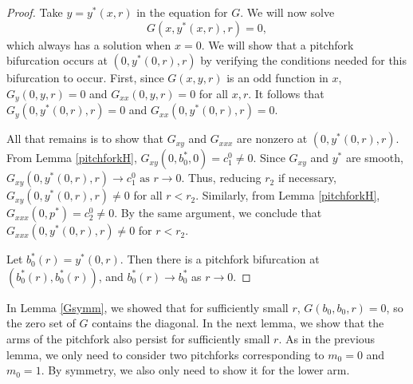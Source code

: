 \documentclass[thesis.tex]{subfiles}
\begin{document}
\begin{lemma}
\begin{proof}
Take $y = y^*(x, r)$ in the equation for $G$. We will now solve
\begin{equation*}
G(x, y^*(x, r), r) = 0,
\end{equation*}
which always has a solution when $x = 0$. We will show that a pitchfork bifurcation occurs at $(0, y^*(0, r), r)$ by verifying the conditions needed for this bifurcation to occur. First, since $G(x, y, r)$ is an odd function in $x$, $G_y(0, y, r) = 0$ and $G_{xx}(0, y, r) = 0$ for all $x, r$. It follows that $G_y(0, y^*(0, r), r) = 0$ and $G_{xx}(0, y^*(0, r), r) = 0$.

All that remains is to show that $G_{xy}$ and $G_{xxx}$ are nonzero at $(0, y^*(0, r), r)$. From Lemma \ref{pitchforkH}, $G_{xy}(0, b_0^*, 0) = c_1^0 \neq 0$. Since $G_{xy}$ and $y^*$ are smooth, $G_{xy}(0, y^*(0, r), r) \rightarrow c_1^0 \text{ as } r \rightarrow 0$. Thus, reducing $r_2$ if necessary, $G_{xy}(0, y^*(0, r), r) \neq 0$ for all $r < r_2$. Similarly, from Lemma \ref{pitchforkH}, $G_{xxx}(0, p^*) = c_2^0 \neq 0$. By the same argument, we conclude that $G_{xxx}(0, y^*(0, r), r) \neq 0$ for $r < r_2$.

Let $b_0^*(r) = y^*(0, r)$. Then there is a pitchfork bifurcation at $(b_0^*(r), b_0^*(r))$, and $b_0^*(r) \rightarrow b_0^*$ as $r \rightarrow 0$.
\end{proof} 
\end{lemma}

In Lemma \ref{Gsymm}, we showed that for sufficiently small $r$, $G(b_0, b_0, r) = 0$, so the zero set of $G$ contains the diagonal. In the next lemma, we show that the arms of the pitchfork also persist for sufficiently small $r$. As in the previous lemma, we only need to consider two pitchforks corresponding to $m_0 = 0$ and $m_0 = 1$. By symmetry, we also only need to show it for the lower arm. 
\end{document}
